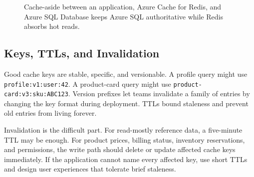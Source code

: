 \begin{figure}[H]
    \centering
    \caption{Cache-aside between an application, Azure Cache for Redis, and Azure SQL Database keeps Azure SQL authoritative while Redis absorbs hot reads.}
    \label{fig:ch4-cache-aside-sql}
\end{figure}

\subsection{Keys, TTLs, and Invalidation}
Good cache keys are stable, specific, and versionable. A profile query might use \texttt{profile:v1:user:42}. A product-card query might use \texttt{product-card:v3:sku:ABC123}. Version prefixes let teams invalidate a family of entries by changing the key format during deployment. TTLs bound staleness and prevent old entries from living forever.

Invalidation is the difficult part. For read-mostly reference data, a five-minute TTL may be enough. For product prices, billing status, inventory reservations, and permissions, the write path should delete or update affected cache keys immediately. If the application cannot name every affected key, use short TTLs and design user experiences that tolerate brief staleness.

